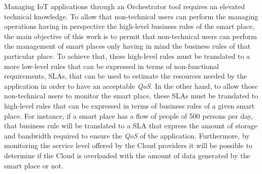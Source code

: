 Managing IoT applications through an Orchestrator tool requires an elevated technical knowledge.
To allow that non-technical users can perform the managing operations having in perspective
the high-level business rules of the smart place, the main objective of this work is to permit
that non-technical users can perform the management of smart places only having in mind the business
rules of that particular place. To achieve that, these high-level rules must be translated to a more
low-level rules that can be expressed in terms of non-functional requirements, SLAs, that can be
used to estimate the resources needed by the application in order to have an acceptable \textit{QoS}.
In the other hand, to allow those non-technical users to monitor the smart place, these SLAs must
be translated to high-level rules that can be expressed in terms of business rules of a given smart place.
For instance, if a smart place has a flow of people of 500 persons per day, that business rule will be
translated to a SLA that express the amount of storage and bandwidth required to ensure the \textit{QoS}
of the application. Furthermore, by monitoring the service level offered by the Cloud providers it will be
possible to determine if the Cloud is overloaded with the amount of data generated by the smart place or not.

